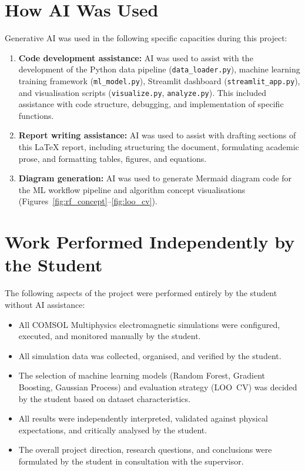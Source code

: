 \documentclass[12pt,a4paper]{report}
\begin{document}
\section*{How AI Was Used}

Generative AI was used in the following specific capacities during this project:

\begin{enumerate}[leftmargin=2cm]
    \item \textbf{Code development assistance:} AI was used to assist with the development of the Python data pipeline (\texttt{data\_loader.py}), machine learning training framework (\texttt{ml\_model.py}), Streamlit dashboard (\texttt{streamlit\_app.py}), and visualisation scripts (\texttt{visualize.py}, \texttt{analyze.py}). This included assistance with code structure, debugging, and implementation of specific functions.

    \item \textbf{Report writing assistance:} AI was used to assist with drafting sections of this \LaTeX{} report, including structuring the document, formulating academic prose, and formatting tables, figures, and equations.

    \item \textbf{Diagram generation:} AI was used to generate Mermaid diagram code for the ML workflow pipeline and algorithm concept visualisations (Figures~\ref{fig:rf_concept}--\ref{fig:loo_cv}).
\end{enumerate}

\section*{Work Performed Independently by the Student}

The following aspects of the project were performed entirely by the student without AI assistance:

\begin{itemize}[leftmargin=2cm]
    \item All COMSOL Multiphysics electromagnetic simulations were configured, executed, and monitored manually by the student.
    \item All simulation data was collected, organised, and verified by the student.
    \item The selection of machine learning models (Random Forest, Gradient Boosting, Gaussian Process) and evaluation strategy (LOO~CV) was decided by the student based on dataset characteristics.
    \item All results were independently interpreted, validated against physical expectations, and critically analysed by the student.
    \item The overall project direction, research questions, and conclusions were formulated by the student in consultation with the supervisor.
\end{itemize}
\end{document}
